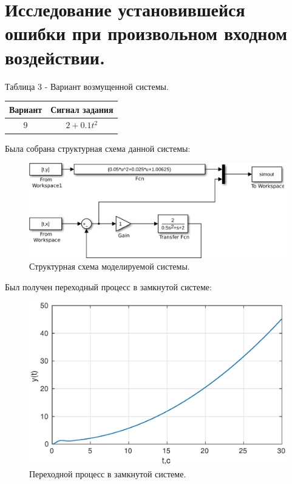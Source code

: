 \documentclass[a4paper,14pt]{article}
\begin{document}
\newpage
\section{Исследование установившейся ошибки при произвольном входном воздействии.}

Таблица 3 - Вариант возмущенной системы.

\begin{center}
\begin{tabular}{ |c|c| } 
 \hline
Вариант & Сигнал задания \\ 
 \hline
 9 & $ 2+0.1t^2 $ \\ 
 \hline
\end{tabular}
\end{center}

Была собрана структурная схема данной системы:

\begin{figure}[H]
\centering
\includegraphics[width=\textwidth]{1/4.eps}
\caption{Структурная схема моделируемой  системы.}
\end{figure}
Был получен переходный процесс в замкнутой системе:


\begin{figure}[H]
\centering
\includegraphics[width=\textwidth]{1/4_1y(t).eps}
\caption{Переходной процесс в замкнутой системе.}
\end{figure}
\end{document}

